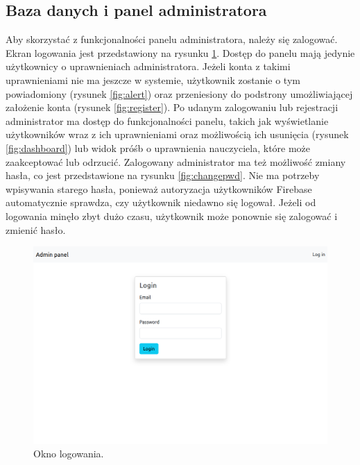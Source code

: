 \documentclass[a4paper,twoside,12pt]{book}
\begin{document}
\subsection{Baza danych i panel administratora}

Aby skorzystać z funkcjonalności panelu administratora, należy się zalogować. Ekran logowania jest przedstawiony na rysunku \ref{fig:login}. Dostęp do panelu mają jedynie użytkownicy o uprawnieniach administratora. Jeżeli konta z takimi uprawnieniami nie ma jeszcze w systemie, użytkownik zostanie o tym powiadomiony (rysunek \ref{fig:alert}) oraz przeniesiony do podstrony umożliwiającej założenie konta (rysunek \ref{fig:register}). Po udanym zalogowaniu lub rejestracji administrator ma dostęp do funkcjonalności panelu, takich jak wyświetlanie użytkowników wraz z ich uprawnieniami oraz możliwością ich usunięcia (rysunek \ref{fig:dashboard}) lub widok próśb o uprawnienia nauczyciela, które może zaakceptować lub odrzucić. Zalogowany administrator ma też możliwość zmiany hasła, co jest przedstawione na rysunku \ref{fig:changepwd}. Nie ma potrzeby wpisywania starego hasła, ponieważ autoryzacja użytkowników Firebase automatycznie sprawdza, czy użytkownik niedawno się logował. Jeżeli od logowania minęło zbyt dużo czasu, użytkownik może ponownie się zalogować i zmienić hasło. 

\begin{figure}[]
\centering
\includegraphics[width=\textwidth]{adminpanel/login}
\caption{Okno logowania.}
\label{fig:login}
\end{figure}
\end{document}
